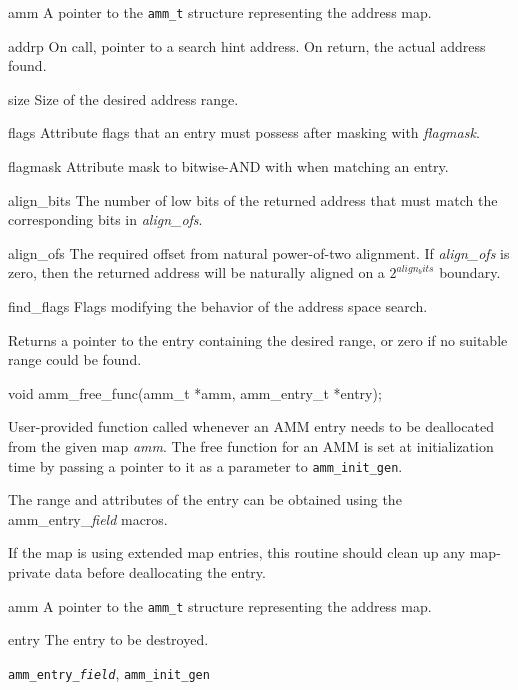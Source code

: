 \begin{apiparm}
	\item[amm]
		A pointer to the {\tt amm_t} structure
		representing the address map.
	\item[addrp]
		On call, pointer to a search hint address.
		On return, the actual address found.
	\item[size]
		Size of the desired address range.
	\item[flags]
		Attribute flags that an entry must possess after masking
		with \emph{flagmask}.
	\item[flagmask]
		Attribute mask to bitwise-AND with when matching an entry.
	\item[align_bits]
		The number of low bits of the returned address
		that must match the corresponding bits in \emph{align_ofs}.
	\item[align_ofs]
		The required offset from natural power-of-two alignment.
		If \emph{align_ofs} is zero,
		then the returned address will be naturally aligned
		on a $2^{align_bits}$ boundary.
	\item[find_flags]
		Flags modifying the behavior of the address space search.
\end{apiparm}
\begin{apiret}
	Returns a pointer to the entry containing the desired range,
	or zero if no suitable range could be found.
\end{apiret}


\begin{apisyn}

	\funcproto void amm_free_func(amm_t *amm, amm_entry_t *entry);
\end{apisyn}
\begin{apidesc}
	User-provided function called whenever an AMM entry needs to be
	deallocated from the given map \emph{amm}.
	The free function for an AMM is set at initialization time
	by passing a pointer to it as a parameter to {\tt amm_init_gen}.

	The range and attributes of the entry can be obtained using the
	amm_entry_\emph{field} macros.

	If the map is using extended map entries,
	this routine should clean up any map-private data before deallocating
	the entry.
\end{apidesc}
\begin{apiparm}
	\item[amm]
		A pointer to the {\tt amm_t} structure
		representing the address map.
	\item[entry]
		The entry to be destroyed.
\end{apiparm}
\begin{apirel}
	{\tt amm_entry_\emph{field}}, {\tt amm_init_gen}
\end{apirel}


